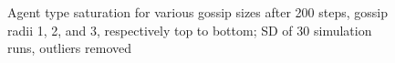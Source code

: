 \documentclass[english]{article}
\begin{document}
\begin{figure}[!h]
  \centering
  \caption{Agent type saturation for various gossip sizes after 200 steps, gossip radii 1, 2, and 3, respectively top to bottom; SD of 30 simulation runs, outliers removed}
  \label{fig:agent_sat/gossip_size_step200}
\end{figure}
\end{document}
